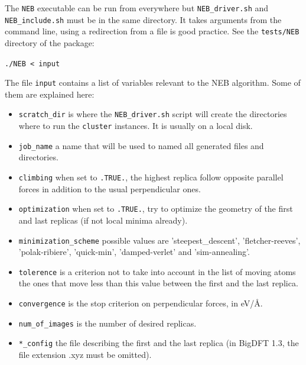 \documentclass[a4paper,11pt]{report}
\begin{document}
The \texttt{NEB} executable can be run from everywhere but \texttt{NEB\_driver.sh} and \texttt{NEB\_include.sh} must be in the same directory. It takes arguments from the command line, using a redirection from a file is good practice. See the \texttt{tests/NEB} directory of the package:
\begin{center}
  \texttt{./NEB < input}
\end{center}
The file \texttt{input} contains a list of variables relevant to the NEB algorithm. Some of them are explained here:
\begin{itemize}
  \item \texttt{scratch\_dir} is where the \texttt{NEB\_driver.sh} script will create the directories where to run the \texttt{cluster} instances. It is usually on a local disk.
  \item \texttt{job\_name} a name that will be used to named all generated files and directories.
  \item \texttt{climbing} when set to \texttt{.TRUE.}, the highest replica follow opposite parallel forces in addition to the usual perpendicular ones.
  \item \texttt{optimization} when set to \texttt{.TRUE.}, try to optimize the geometry of the first and last replicas (if not local minima already).
  \item \texttt{minimization\_scheme} possible values are 'steepest\_descent', 'fletcher-reeves', 'polak-ribiere', 'quick-min', 'damped-verlet' and 'sim-annealing'.
  \item \texttt{tolerence} is a criterion not to take into account in the list of moving atoms the ones that move less than this value between the first and the last replica.
  \item \texttt{convergence} is the stop criterion on perpendicular forces, in eV/\AA.
  \item \texttt{num\_of\_images} is the number of desired replicas.
  \item \texttt{*\_config} the file describing the first and the last replica (in BigDFT 1.3, the file extension .xyz must be omitted).
\end{itemize}
\end{document}
